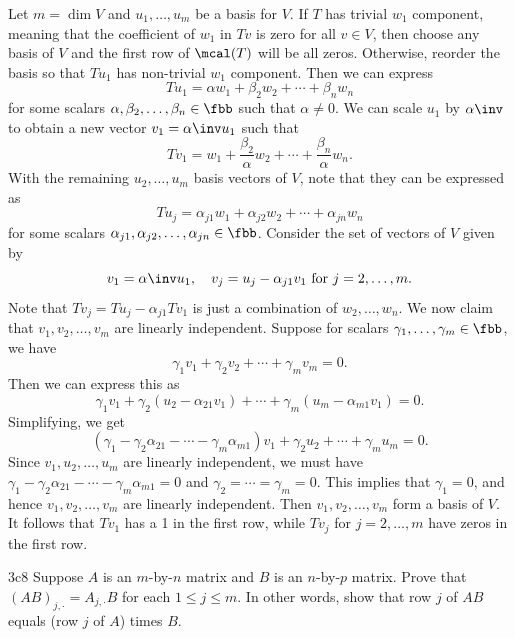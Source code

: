 \begin{sol}
    Let $m = \dim V$ and $u_1, \ldots, u_m$ be a basis for $V$.
	If $T$ has trivial $w_1$ component, meaning that the coefficient of $w_1$ in $Tv$ is zero for all $v \in V$, then choose any basis of $V$ and the first row of $\mcal(T)$ will be all zeros.
	Otherwise, reorder the basis so that $Tu_1$ has non-trivial $w_1$ component.
	Then we can express
    \[
    	Tu_1 = \alpha w_1 + \beta_2 w_2 + \cdots + \beta_n w_n
    \]
    for some scalars $\alpha, \beta_2, \ldots, \beta_n \in \fbb$ such that $\alpha \neq 0$.
	We can scale $u_1$ by $\alpha\inv$ to obtain a new vector $v_1 = \alpha\inv u_1$ such that
    \[
    	Tv_1 = w_1 + \frac{\beta_2}{\alpha} w_2 + \cdots + \frac{\beta_n}{\alpha} w_n.
    \]
    With the remaining $u_2, \ldots, u_m$ basis vectors of $V$, note that they can be expressed as
    \[
    	Tu_j = \alpha_{j1} w_1 + \alpha_{j2} w_2 + \cdots + \alpha_{jn} w_n
    \]
    for some scalars $\alpha_{j1}, \alpha_{j2}, \ldots, \alpha_{jn} \in \fbb$.
	Consider the set of vectors of $V$ given by
    \[
    	v_1 = \alpha\inv u_1, \quad v_j = u_j - \alpha_{j1} v_1 \text{ for } j = 2, \ldots, m.
    \]
    Note that $Tv_j = Tu_j - \alpha_{j1} Tv_1$ is just a combination of $w_2, \ldots, w_n$.
	We now claim that $v_1, v_2, \ldots, v_m$ are linearly independent.
	Suppose for scalars $\gamma_1, \ldots, \gamma_m \in \fbb$, we have
    \[
    	\gamma_1 v_1 + \gamma_2 v_2 + \cdots + \gamma_m v_m = 0.
    \]
    Then we can express this as
    \[
    	\gamma_1 v_1 + \gamma_2 (u_2 - \alpha_{21} v_1) + \cdots + \gamma_m (u_m - \alpha_{m1} v_1) = 0.
    \]
    Simplifying, we get
    \[
    	(\gamma_1 - \gamma_2 \alpha_{21} - \cdots - \gamma_m \alpha_{m1}) v_1 + \gamma_2 u_2 + \cdots + \gamma_m u_m = 0.
    \]
    Since $v_1, u_2, \ldots, u_m$ are linearly independent, we must have $\gamma_1 - \gamma_2 \alpha_{21} - \cdots - \gamma_m \alpha_{m1} = 0$ and $\gamma_2 = \cdots = \gamma_m = 0$.
	This implies that $\gamma_1 = 0$, and hence $v_1, v_2, \ldots, v_m$ are linearly independent.
	Then $v_1, v_2, \ldots, v_m$ form a basis of $V$.
	It follows that $Tv_1$ has a 1 in the first row, while $Tv_j$ for $j = 2, \ldots, m$ have zeros in the first row.
\end{sol}

\begin{exercise}{3c8}
    Suppose $A$ is an $m$-by-$n$ matrix and $B$ is an $n$-by-$p$ matrix.
	Prove that $(AB)_{j, \cdot} = A_{j, \cdot} B$ for each $1 \leq j \leq m$.
	In other words, show that row $j$ of $AB$ equals (row $j$ of $A$) times $B$.
\end{exercise}

